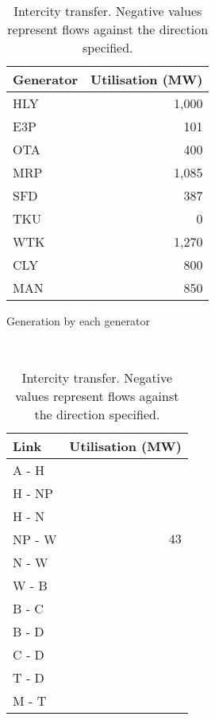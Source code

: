 \documentclass[11pt]{article}
\begin{document}
\begin{table}[h]
	\begin{minipage}{0.5\linewidth}
		\centering
		\begin{tabular}{@{}lr@{}}
		\toprule
		Generator & Utilisation (MW) \\ \midrule
		HLY       & 1,000             \\
		E3P       & 101               \\
		OTA       & 400              \\
		MRP       & 1,085             \\
		SFD       & 387              \\
		TKU       & 0                \\
		WTK       & 1,270             \\
		CLY       & 800              \\
		MAN       & 850              \\ \bottomrule
		\end{tabular}
		\caption{Generation by each generator}
	\end{minipage}
	~
	\begin{minipage}{0.5\linewidth}
		\centering
		\begin{tabular}{@{}lr@{}}
		\toprule
		Link & Utilisation (MW) \\ \midrule
		A - H       & \color{red}{$-451$}            \\ %
		H - NP      & \color{red}{$-284$}            \\ %
		H - N       & \color{ForestGreen}{$196$}     \\ %
		NP - W      & $43$                           \\ %
		N - W       & \color{red}{$-88$}            \\ %
		W - B       & \color{red}{$-1000$}           \\ %
		B - C       & \color{ForestGreen}{$292.2$}     \\ %
		B - D       & \color{red}{$-22.2$}              \\ %
		C - D       & \color{red}{$-785.8$}            \\ %
		T - D       & \color{red}{$-233$}            \\ %
		M - T       & \color{red}{$-850$}            \\ \bottomrule
		\end{tabular}
		\caption{Intercity transfer. Negative values represent flows against the direction specified.}
	\end{minipage}
\end{table}
\end{document}
